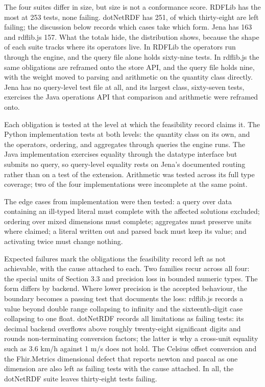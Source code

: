 The four suites differ in size, but size is not a conformance score. RDFLib has the most at 253 tests, none failing. dotNetRDF has 251, of which thirty-eight are left failing; the discussion below records which cases take which form. Jena has 163 and rdflib.js 157. What the totals hide, the distribution shows, because the shape of each suite tracks where its operators live. In RDFLib the operators run through the engine, and the query file alone holds sixty-nine tests. In rdflib.js the same obligations are reframed onto the store API, and the query file holds nine, with the weight moved to parsing and arithmetic on the quantity class directly. Jena has no query-level test file at all, and its largest class, sixty-seven tests, exercises the Java operations API that comparison and arithmetic were reframed onto.

Each obligation is tested at the level at which the feasibility record claims it. The Python implementation tests at both levels: the quantity class on its own, and the operators, ordering, and aggregates through queries the engine runs. The Java implementation exercises equality through the datatype interface but submits no query, so query-level equality rests on Jena's documented routing rather than on a test of the extension. Arithmetic was tested across its full type coverage; two of the four implementations were incomplete at the same point.

The edge cases from implementation were then tested: a query over data containing an ill-typed literal must complete with the affected solutions excluded; ordering over mixed dimensions must complete; aggregates must preserve units where claimed; a literal written out and parsed back must keep its value; and activating twice must change nothing.

Expected failures mark the obligations the feasibility record left as not achievable, with the cause attached to each. Two families recur across all four: the special units of Section 3.3 and precision loss in bounded numeric types. The form differs by backend. Where lower precision is the accepted behaviour, the boundary becomes a passing test that documents the loss: rdflib.js records a value beyond double range collapsing to infinity and the sixteenth-digit case collapsing to one float. dotNetRDF records all limitations as failing tests: its decimal backend overflows above roughly twenty-eight significant digits and rounds non-terminating conversion factors; the latter is why a cross-unit equality such as 3.6 km/h against 1 m/s does not hold. The Celsius offset conversion and the Fhir.Metrics dimensional defect that reports newton and pascal as one dimension are also left as failing tests with the cause attached. In all, the dotNetRDF suite leaves thirty-eight tests failing.



